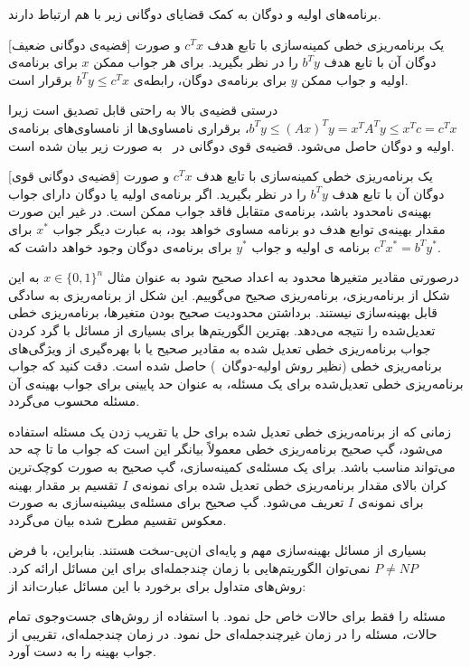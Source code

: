 برنامه‌های اولیه و دوگان به کمک قضایای دوگانی زیر با هم ارتباط دارند.


[قضیه‌ی دوگانی ضعیف] 
یک برنامه‌ریزی خطی کمینه‌سازی با تابع هدف $c^T x$ و صورت دوگان آن با تابع هدف $b^T y$ را در نظر بگیرید. برای هر جواب ممکن $x$ برای برنامه‌ی اولیه و جواب ممکن $y$ برای برنامه‌ی دوگان، رابطه‌ی  $b^T y \leq c^T x$ برقرار است.

درستی قضیه‌ی بالا به راحتی قابل تصدیق است زیرا $b^T y \leq (Ax)^T y = x^T A^T y \leq x^T c = c^T x$، برقراری نامساوی‌ها از نامساوی‌های برنامه‌‌ی اولیه و دوگان حاصل می‌شود. قضیه‌ی قوی دوگانی در~\cite{N47} به صورت زیر بیان شده است.


[قضیه‌ی دوگانی قوی] 
یک برنامه‌ریزی خطی کمینه‌سازی با تابع هدف $c^T x$ و صورت دوگان آن با تابع هدف $b^T y$ را در نظر بگیرید. اگر برنامه‌ی اولیه یا دوگان دارای جواب بهینه‌ی نامحدود باشد، برنامه‌ی متقابل فاقد جواب ممکن است. در غیر این صورت مقدار بهینه‌ی توابع هدف دو برنامه مساوی خواهد بود، به عبارت دیگر جواب $x^*$ برای برنامه ی اولیه و جواب $y^*$  برای برنامه‌ی دوگان وجود خواهد داشت که $c^T x^* = b^T y^*$.
 
درصورتی مقادیر متغیر‌ها محدود به اعداد صحیح شود به عنوان مثال $x \in \{0, 1\}^n$ به این شکل از برنامه‌ریزی،  برنامه‌ریزی صحیح می‌گوییم. این شکل از برنامه‌ریزی به سادگی قابل بهینه‌سازی نیستند. برداشتن محدودیت صحیح بودن متغیرها، برنامه‌ریزی خطی تعدیل‌شده را نتیجه می‌دهد. بهترین الگوریتم‌ها برای بسیاری از مسائل با گرد کردن جواب برنامه‌ریزی خطی تعدیل شده به مقادیر صحیح یا با بهره‌گیری از ویژگی‌های برنامه‌ریزی خطی 
(نظیر روش اولیه-دوگان~\cite{ISAAC12}) حاصل شده است. 
دقت کنید که جواب برنامه‌ریزی خطی تعدیل‌شده برای یک مسئله، به عنوان حد پایینی برای جواب بهینه‌ی آن مسئله محسوب می‌گردد.

زمانی که از برنامه‌ریزی خطی تعدیل شده برای حل یا تقریب زدن یک مسئله استفاده می‌شود، گپ صحیح برنامه‌ریزی خطی معمولاً بیانگر این است که جواب ما تا چه حد می‌تواند مناسب باشد. برای یک مسئله‌ی کمینه‌سازی، گپ صحیح به صورت 
کوچک‌ترین کران بالای مقدار برنامه‌ریزی خطی تعدیل شده برای نمونه‌ی $I$ تقسیم بر مقدار بهینه‌ برای نمونه‌ی $I$
تعریف می‌شود.
گپ صحیح برای مسئله‌ی بیشینه‌سازی به صورت معکوس تقسیم مطرح شده بیان می‌گردد.



بسیاری از مسائل بهینه‌سازی مهم و پایه‌ای
ان‌پی-سخت هستند. بنابراین، با فرض $P \neq NP$
نمی‌توان الگوریتم‌هایی با زمان چندجمله‌ای برای این مسائل ارائه کرد.
روش‌های متداول برای برخورد با این مسائل عبارت‌اند از:

 مسئله را فقط برای حالات خاص حل نمود.
 با استفاده از روش‌های جست‌وجوی تمام حالات، 
مسئله را در زمان غیرچندجمله‌ای حل نمود.
 در زمان چندجمله‌ای، تقریبی از جواب بهینه را به دست آورد.

